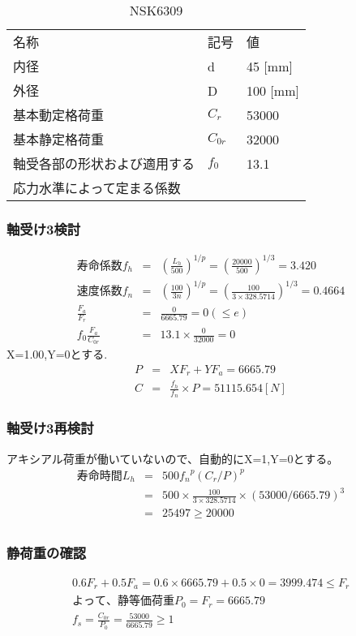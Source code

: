 \begin{table}[htb]
\begin{center}
  \caption{NSK6309}
  \begin{tabular}{lll} \hline
名称&記号&値\\
内径& d &45 [mm]\\
外径& D &100 [mm]\\
基本動定格荷重&$C_{r}$&53000\\
基本静定格荷重&$C_{0r}$&32000\\
軸受各部の形状および適用する&$f_0$&13.1\\
応力水準によって定まる係数&&\\
\hline
  \end{tabular}
\end{center}
\end{table}

\subsubsection{軸受け3検討}
\begin{eqnarray}
寿命係数f_h &=& \left( \frac{L_h}{500} \right)^{1/p} = \left( \frac{20000}{500} \right)^{1/3} = 3.420\\
速度係数f_n &=& \left( \frac{100}{3n} \right)^{1/p} = \left( \frac{100}{3 \times 328.5714} \right)^{1/3} = 0.4664\\
\frac{F_a}{F_r} &=& \frac{0}{6665.79} = 0 (\leq e)\\
f_0\frac{F_a}{C_{0r}}&=& 13.1 \times \frac{0}{32000} = 0
\end{eqnarray}
X=1.00,Y=0とする.
\begin{eqnarray}
P &=& XF_r+YF_a = 6665.79\\
C &=& \frac{f_h}{f_n} \times P = 51115.654[N]
\end{eqnarray}

\subsubsection{軸受け3再検討}
アキシアル荷重が働いていないので、自動的にX=1,Y=0とする。
\begin{eqnarray}
寿命時間L_h &=& 500{f_n}^p(C_r/P)^p\\
           &=& 500 \times \frac{100}{3 \times 328.5714} \times (53000/6665.79)^3\\
           &=& 25497 \geq 20000\\
\end{eqnarray}

\subsubsection{静荷重の確認}
\begin{eqnarray}
0.6F_r+0.5F_a=0.6 \times 6665.79 + 0.5 \times 0 = 3999.474 \leq F_r\\
よって、静等価荷重P_0 = F_r = 6665.79\\
f_s = \frac{C_{0r}}{P_0} = \frac{53000}{6665.79} \geq 1
\end{eqnarray}





